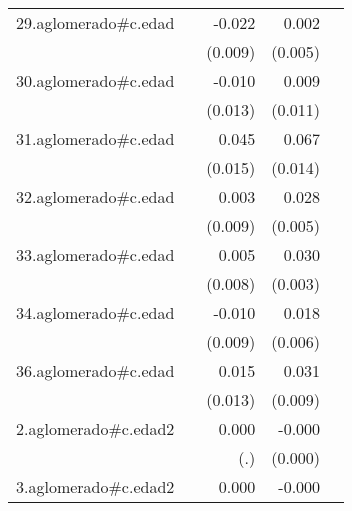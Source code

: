 {\begin{longtable}{l*{4}{D{.}{.}{-1}}}
\addlinespace
29.aglomerado#c.edad&                     &      -0.022\sym{*}  &       0.002         &                     \\
            &                     &     (0.009)         &     (0.005)         &                     \\
\addlinespace
30.aglomerado#c.edad&                     &      -0.010         &       0.009         &                     \\
            &                     &     (0.013)         &     (0.011)         &                     \\
\addlinespace
31.aglomerado#c.edad&                     &       0.045\sym{**} &       0.067\sym{***}&                     \\
            &                     &     (0.015)         &     (0.014)         &                     \\
\addlinespace
32.aglomerado#c.edad&                     &       0.003         &       0.028\sym{***}&                     \\
            &                     &     (0.009)         &     (0.005)         &                     \\
\addlinespace
33.aglomerado#c.edad&                     &       0.005         &       0.030\sym{***}&                     \\
            &                     &     (0.008)         &     (0.003)         &                     \\
\addlinespace
34.aglomerado#c.edad&                     &      -0.010         &       0.018\sym{**} &                     \\
            &                     &     (0.009)         &     (0.006)         &                     \\
\addlinespace
36.aglomerado#c.edad&                     &       0.015         &       0.031\sym{***}&                     \\
            &                     &     (0.013)         &     (0.009)         &                     \\
\addlinespace
2.aglomerado#c.edad2&                     &       0.000         &      -0.000\sym{**} &                     \\
            &                     &         (.)         &     (0.000)         &                     \\
\addlinespace
3.aglomerado#c.edad2&                     &       0.000         &      -0.000         &                     \\

\end{longtable}}
